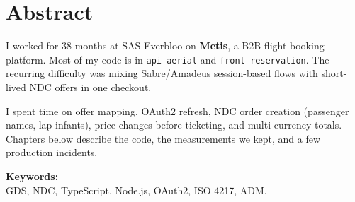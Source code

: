\chapter*{Abstract}

\noindent I worked for 38 months at SAS Everbloo on \textbf{Metis}, a B2B flight booking platform. Most of my code is in \texttt{api-aerial} and \texttt{front-reservation}. The recurring difficulty was mixing Sabre/Amadeus session-based flows with short-lived NDC offers in one checkout.

\noindent I spent time on offer mapping, OAuth2 refresh, NDC order creation (passenger names, lap infants), price changes before ticketing, and multi-currency totals. Chapters below describe the code, the measurements we kept, and a few production incidents.

\vspace{0.6cm}
\noindent \textbf{\large Keywords:}\\
\noindent GDS, NDC, TypeScript, Node.js, OAuth2, ISO 4217, ADM.

